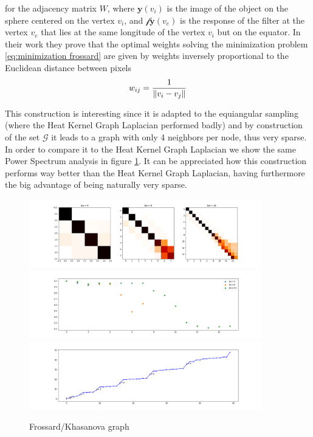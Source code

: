 for the adjacency matrix $W$, where $\mathbf y(v_i)$ is the image of the object on the sphere centered on the vertex $v_i$, and $\mathcal f\mathbf y(v_e)$ is the response of the filter at the vertex $v_e$ that lies at the same longitude of the vertex $v_i$ but on the equator. In their work they prove that the optimal weights solving the minimization problem \ref{eq:minimization frossard} are given by weights inversely proportional to the Euclidean distance between pixels
$$
w_{ij} = \frac{1}{\left\lVert v_i-v_j\right\rVert}
$$

This construction is interesting since it is adapted to the equiangular sampling (where the Heat Kernel Graph Laplacian performed badly) and by construction of the set $\mathcal G$ it leads to a graph with only 4 neighbors per node, thus very sparse. In order to compare it to the Heat Kernel Graph Laplacian we show the same Power Spectrum analysis in figure \ref{fig:Frossard/Khasanova graph}. It can be appreciated how this construction performs way better than the Heat Kernel Graph Laplacian, having furthermore the big advantage of being naturally very sparse.
\begin{figure}[h!]
	\label{fig:Frossard/Khasanova graph}
	\centering
	\includegraphics[width=0.9\textwidth]{../codes/02.HeatKernelGraphLaplacian/equiangular/equi_Khasanova_Frossard_full.png}
	\includegraphics[width=0.9\textwidth]{../codes/02.HeatKernelGraphLaplacian/equiangular/equi_Khasanova_Frossard_full_diagonal.png}
	\includegraphics[width=0.9\textwidth]{../codes/02.HeatKernelGraphLaplacian/equiangular/equi_full_Khasanova_Frossard_eigenvalues_16.png}
	\caption{Frossard/Khasanova graph}
\end{figure}

